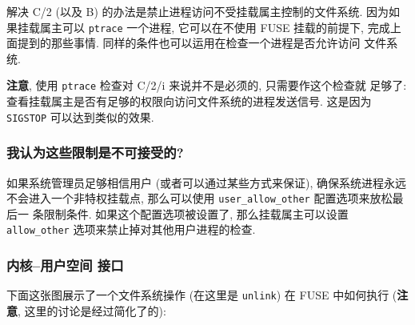 \documentclass[nofonts]{ctexart}
\begin{document}
解决 C/2 (以及 B) 的办法是禁止进程访问不受挂载属主控制的文件系统.
因为如果挂载属主可以 \texttt{ptrace} 一个进程, 它可以在不使用 FUSE
挂载的前提下, 完成上面提到的那些事情.
同样的条件也可以运用在检查一个进程是否允许访问 文件系统.

\textbf{注意}, 使用 \texttt{ptrace} 检查对 C/2/i 来说并不是必须的,
只需要作这个检查就 足够了:
查看挂载属主是否有足够的权限向访问文件系统的进程发送信号. 这是因为
\texttt{SIGSTOP} 可以达到类似的效果.

\subsubsection{我认为这些限制是不可接受的?}\label{ux6211ux8ba4ux4e3aux8fd9ux4e9bux9650ux5236ux662fux4e0dux53efux63a5ux53d7ux7684}

如果系统管理员足够相信用户 (或者可以通过某些方式来保证),
确保系统进程永远 不会进入一个非特权挂载点, 那么可以使用
\texttt{user\_allow\_other} 配置选项来放松最后一 条限制条件.
如果这个配置选项被设置了, 那么挂载属主可以设置 \texttt{allow\_other}
选项来禁止掉对其他用户进程的检查.

\subsubsection{内核--用户空间
接口}\label{ux5185ux6838ux7528ux6237ux7a7aux95f4-ux63a5ux53e3}

下面这张图展示了一个文件系统操作 (在这里是 \texttt{unlink}) 在 FUSE
中如何执行 ({\textbf{注意}, 这里的讨论是经过简化了的}):
\end{document}
